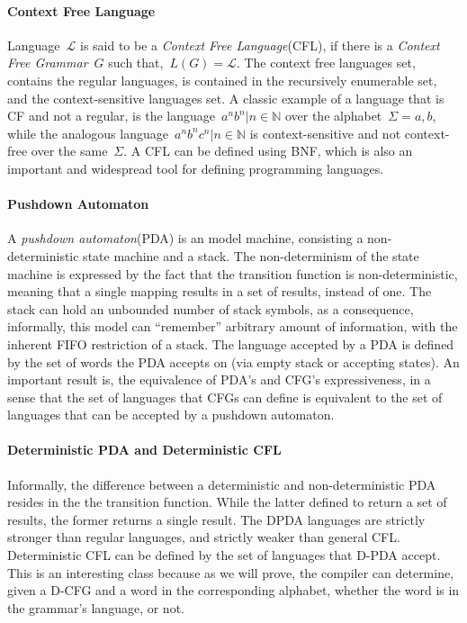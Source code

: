 \paragraph{Context Free Language}
Language~$\mathcal{L}$ is said to be a \emph{Context Free Language}(CFL), if there
  is a \emph{Context Free Grammar}~$G$ such that,~$L(G)=\mathcal{L}$.
The context free languages set, contains the regular languages, 
  is contained in the recursively enumerable set, and the context-sensitive languages set.
A classic example of a language that is CF and not a regular, 
  is the language~${a^nb^n|n\in\mathbb{N}}$ over the alphabet~$\Sigma={a,b}$,
  while the analogous language~${a^nb^nc^n|n\in\mathbb{N}}$ is context-sensitive 
  and not context-free over the same~$\Sigma$.
A CFL can be defined using BNF, which is also an important and widespread tool for 
  defining programming languages.
\paragraph{Pushdown Automaton}
A \emph{pushdown automaton}(PDA) is an model machine, consisting a non-deterministic state machine
  and a stack. 
The non-determinism of the state machine is expressed by the fact that the transition function
  is non-deterministic, meaning that a single mapping results in a set of results, instead of one.
The stack can hold an unbounded number of stack symbols, as a consequence, informally, 
  this model can ``remember'' arbitrary amount of information, with the inherent FIFO restriction 
  of a stack.
The language accepted by a PDA is defined by the set of words the PDA accepts on 
  (via empty stack or accepting states).
An important result is, the equivalence of PDA's and CFG's expressiveness, in a sense that
  the set of languages that CFGs can define is equivalent to the set of languages that can be
  accepted by a pushdown automaton.
\paragraph{Deterministic PDA and Deterministic CFL}
Informally, the difference between a deterministic and non-deterministic PDA resides in the
  the transition function. 
While the latter defined to return a set of results, the former returns a single result.
The DPDA languages are strictly stronger than regular languages, and strictly weaker than
  general CFL.
Deterministic CFL can be defined by the set of languages that D-PDA accept.
This is an interesting class because as we will prove, the \Java compiler can determine,
  given a D-CFG and a word in the corresponding alphabet, whether the word is in the 
  grammar's language, or not.
